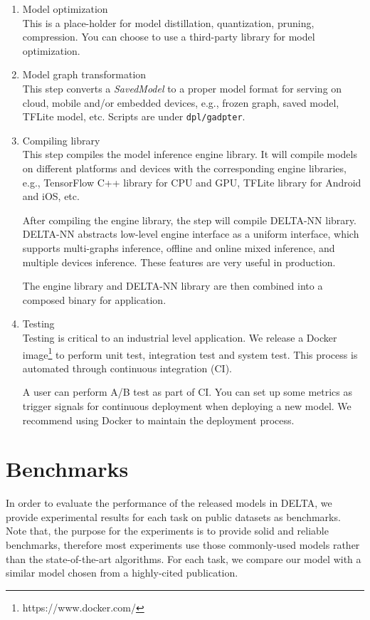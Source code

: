 \documentclass{article}
\begin{document}
\begin{enumerate}
    \item Model optimization  \\
    This is a place-holder for model distillation, quantization, pruning, compression. You can choose to use a third-party library for model optimization.




    \item Model graph transformation \\
    This step converts a \textit{SavedModel} to a proper model format for serving on cloud, mobile and/or embedded devices, e.g., frozen graph, saved model, TFLite model, etc. Scripts are under \texttt{dpl/gadpter}.

    \item Compiling library \\
    This step compiles the model inference engine library. It will compile models on different platforms and devices with the corresponding engine libraries, e.g., TensorFlow C++ library for CPU and GPU, TFLite library for Android and iOS, etc.






    After compiling the engine library, the step will compile DELTA-NN library. DELTA-NN abstracts low-level engine interface as a uniform interface, which supports multi-graphs inference,  offline and online mixed inference, and multiple devices inference. These features are very useful in production.

    The engine library and DELTA-NN library are then combined into a composed binary for application.


    \item Testing  \\
    Testing is critical to an industrial level application. We release a Docker image\footnote{https://www.docker.com/} to perform unit test, integration test and system test. This process is automated through continuous integration (CI).

    A user can perform A/B test as part of CI. You can set up some metrics as trigger signals for continuous deployment when deploying a new model. We recommend using Docker to maintain the deployment process.


\end{enumerate}


\section{Benchmarks}
In order to evaluate the performance of the released models in DELTA, we provide experimental results for each task on public datasets as benchmarks. Note that, the purpose for the experiments is to provide solid and reliable benchmarks, therefore most experiments use those commonly-used models rather than the state-of-the-art algorithms. For each task, we compare our model with a similar model chosen from a highly-cited publication.
\end{document}
